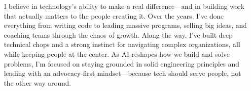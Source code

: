 

\begin{cvparagraph}

I believe in technology’s ability to make a real difference—and in building work that actually matters to the people creating it. Over the years, I’ve done everything from writing code to leading massive programs, selling big ideas, and coaching teams through the chaos of growth. Along the way, I’ve built deep technical chops and a strong instinct for navigating complex organizations, all while keeping people at the center. As AI reshapes how we build and solve problems, I’m focused on staying grounded in solid engineering principles and leading with an advocacy-first mindset—because tech should serve people, not the other way around.
\end{cvparagraph}
